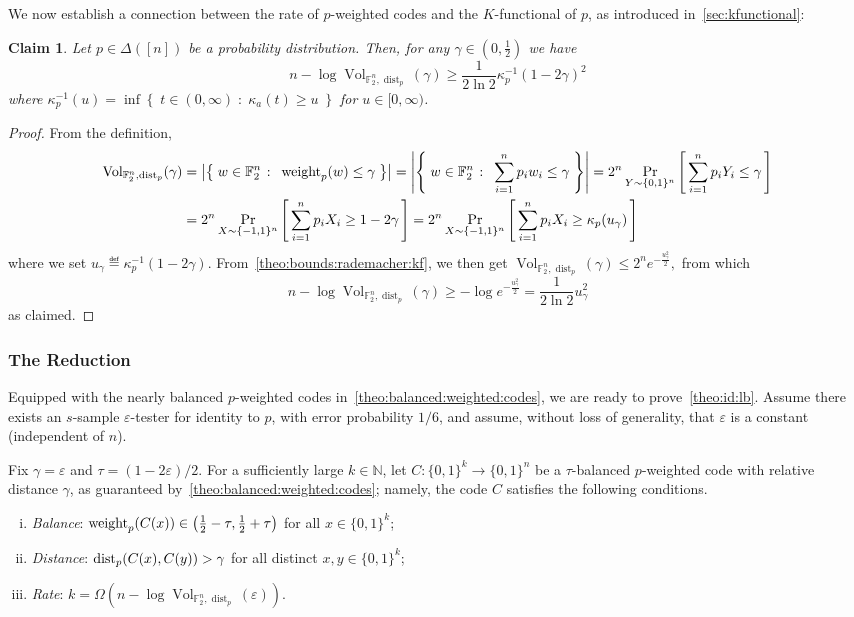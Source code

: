 \documentclass[11pt]{article}
\newtheorem{claim}[clm]{Claim}
\theoremstyle{remark}   	\newtheorem{remark}[theorem]{Remark}
\theoremstyle{definition}   	\newaliascnt{defn}{theorem}
\newcommand{\eps}{\ensuremath{\varepsilon}\xspace}
\newcommand{\domain}[1][{[n]}]{\ensuremath{#1}\xspace} \newcommand{\distribs}[1]{\Delta\!\left(#1\right)} \newcommand{\yes}{{\sf{}yes}\xspace}
\newcommand{\setOfSuchThat}[2]{ \left\{\; #1 \;\colon\; #2\; \right\} } 			\newcommand{\indicSet}[1]{\mathds{1}_{#1}}                                              \newcommand{\indic}[1]{\indicSet{\left\{#1\right\}}}                                             \newcommand{\disjunion}{\amalg}
\newcommand{\proba}{\Pr}
\newcommand{\probaDistrOf}[2]{\proba_{#1}\left[\, #2\, \right]}
\newcommand{\abs}[1]{\left\lvert #1 \right\rvert}
\newcommand{\N}{\ensuremath{\mathbb{N}}\xspace}
\newcommand{\kf}[1]{\kappa_{#1}}
\newcommand{\bitset}{\ensuremath{\{0,1\}}}
\newcommand{\pdistfunc}[1][p]{\operatorname{dist}_{#1}}
\newcommand{\pweightfunc}[1][p]{\operatorname{weight}_{#1}}
\newcommand{\pdist}[3][p]{\pdistfunc[#1]\mleft({#2, #3}\mright)}
\newcommand{\pweight}[2][p]{\pweightfunc[#1]\mleft({#2}\mright)}
\begin{document}
We now establish a connection between the rate of $p$-weighted codes and the $K$-functional of $p$, as introduced in~\autoref{sec:kfunctional}:

\begin{claim}\label{claim:connection:pweighted:kfunctional}
Let $p\in\distribs{\domain}$ be a probability distribution. Then, for any $\gamma\in(0,\frac{1}{2})$ we have
\[
    n - \log \operatorname{Vol}_{\mathbb{F}_2^n,\pdistfunc[p]}(\gamma) \geq \frac{1}{2\ln 2}\kf{p}^{-1}(1-2\gamma)^2
\]
where $\kf{p}^{-1}(u) = \inf\setOfSuchThat{ t\in(0,\infty) }{ \kf{a}(t) \geq u }$ for $u\in[0,\infty)$. 
\end{claim}
\begin{proof}
  From the definition,
  \begin{align*}
    \operatorname{Vol}_{\mathbb{F}_2^n,\pdistfunc[p]}(\gamma)
        &= \abs{ \setOfSuchThat{w\in \mathbb{F}_2^n }{ \pweight[p]{w} \leq \gamma } }
        = \abs{ \setOfSuchThat{w\in \mathbb{F}_2^n }{ \sum_{i=1}^n p_i w_i \leq \gamma } }
        = 2^n \probaDistrOf{Y \sim \bitset^n }{ \sum_{i=1}^n p_i Y_i \leq \gamma }  \\
        &= 2^n \probaDistrOf{X \sim \{-1,1\}^n }{ \sum_{i=1}^n p_i X_i \geq 1-2\gamma } 
        = 2^n \probaDistrOf{X \sim \{-1,1\}^n }{ \sum_{i=1}^n p_i X_i \geq \kf{p}(u_\gamma) } 
  \end{align*}
  where we set $u_\gamma \eqdef \kf{p}^{-1}(1-2\gamma)$. From~\autoref{theo:bounds:rademacher:kf}, we then get
  $
    \operatorname{Vol}_{\mathbb{F}_2^n,\pdistfunc[p]}(\gamma) \leq 2^n e^{-\frac{u_\gamma^2}{2}}, 
  $
  from which
  \[
      n-\log\operatorname{Vol}_{\mathbb{F}_2^n,\pdistfunc[p]}(\gamma) \geq -\log e^{-\frac{u_\gamma^2}{2}} = \frac{1}{2\ln 2} u_\gamma^2
  \]
  as claimed.
\end{proof}

\subsubsection{The Reduction}
Equipped with the nearly balanced $p$-weighted codes in~\autoref{theo:balanced:weighted:codes}, we are ready to prove~\autoref{theo:id:lb}. Assume there exists an $s$-sample $\eps$-tester for identity to $p$, with error probability $1/6$, and assume, without loss of generality, that $\eps$ is a constant (independent of $n$).

Fix $\gamma = \eps$ and $\tau =(1 - 2\eps)/2$. For a sufficiently large $k\in\N$, let $C\colon \bitset^k \to \bitset^n$ be a $\tau$-balanced $p$-weighted code with relative distance $\gamma$, as guaranteed by~\autoref{theo:balanced:weighted:codes}; namely, the code $C$ satisfies the following conditions.
\begin{enumerate}[(i)]
  \item \emph{Balance}: $\pweight[p]{C(x)}\in\left(\frac{1}{2} -\tau, \frac{1}{2}+\tau\right)$ for all $x\in \bitset^k$;
  \item \emph{Distance}: $\pdist[p]{C(x)}{C(y)} > \gamma$ for all distinct $x,y\in \bitset^k$;
  \item \emph{Rate}: $k = \Omega(n - \log \operatorname{Vol}_{\mathbb{F}_2^n,\pdistfunc[p]}(\eps))$.
\end{enumerate}
\end{document}
